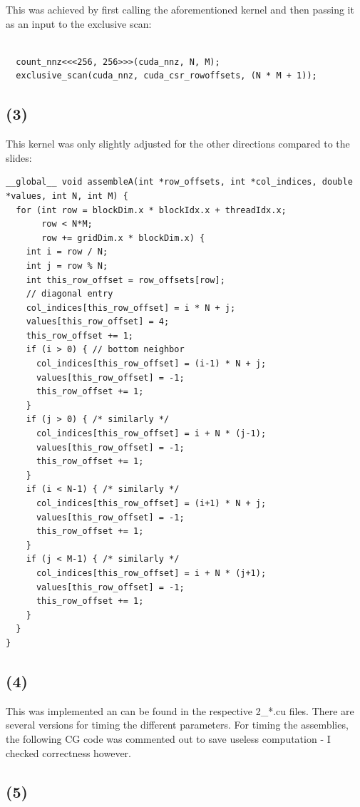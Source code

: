 \documentclass[11pt]{article}
\begin{document}
This was achieved by first calling the aforementioned kernel and then passing it as an input to the exclusive scan:

\begin{verbatim}

  count_nnz<<<256, 256>>>(cuda_nnz, N, M);
  exclusive_scan(cuda_nnz, cuda_csr_rowoffsets, (N * M + 1));

\end{verbatim}
\pagebreak
\subsection{(3)}

This kernel was only slightly adjusted for the other directions compared to the slides:
\begin{verbatim}
__global__ void assembleA(int *row_offsets, int *col_indices, double *values, int N, int M) {
  for (int row = blockDim.x * blockIdx.x + threadIdx.x;
       row < N*M;
       row += gridDim.x * blockDim.x) {
    int i = row / N;
    int j = row % N;
    int this_row_offset = row_offsets[row];
    // diagonal entry
    col_indices[this_row_offset] = i * N + j;
    values[this_row_offset] = 4;
    this_row_offset += 1;
    if (i > 0) { // bottom neighbor
      col_indices[this_row_offset] = (i-1) * N + j;
      values[this_row_offset] = -1;
      this_row_offset += 1;
    }
    if (j > 0) { /* similarly */
      col_indices[this_row_offset] = i + N * (j-1);
      values[this_row_offset] = -1;
      this_row_offset += 1;
    }
    if (i < N-1) { /* similarly */
      col_indices[this_row_offset] = (i+1) * N + j;
      values[this_row_offset] = -1;
      this_row_offset += 1;
    }
    if (j < M-1) { /* similarly */
      col_indices[this_row_offset] = i + N * (j+1);
      values[this_row_offset] = -1;
      this_row_offset += 1;
    }
  }
}

\end{verbatim}

\subsection{(4)}

This was implemented an can be found in the respective 2_*.cu files. There are several versions for timing the different parameters. For timing the assemblies, the following CG code was commented out to save useless computation - I checked correctness however.

\subsection{(5)}
\end{document}
